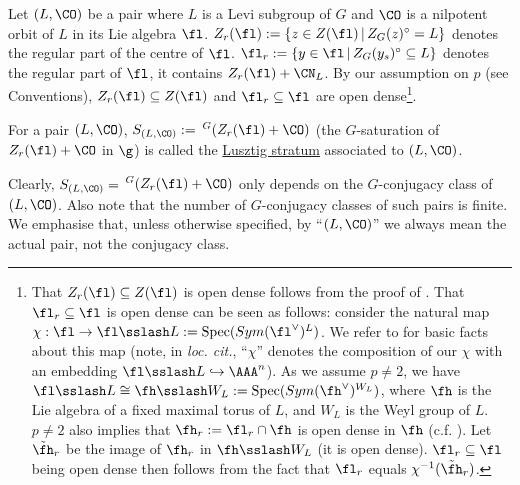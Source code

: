 Let $(L,\CO)$ be a pair where $L$ is a Levi subgroup of $G$ and $\CO$ is a nilpotent orbit of $L$ in its Lie algebra $\fl$. $Z_r(\fl):=\{z\in Z(\fl)\,|\, Z_G(z)^\circ=L\}$ denotes the regular part of the centre of $\fl$. $\fl_r:=\{y\in\fl\,|\, Z_G(y_s)^\circ\subseteq L\}$ denotes the regular part of $\fl$, it contains $Z_r(\fl)+\CN_L$. By our assumption on $p$ (see Conventions), $Z_r(\fl)\subseteq Z(\fl)$ and  $\fl_r\subseteq \fl$ are open dense\footnote{That $Z_r(\fl)\subseteq Z(\fl)$ is open dense follows from the proof of \cite[.13.i]{letellier_fourier_2005}. That $\fl_r\subseteq \fl$ is open dense can be seen as follows: consider the natural map $\chi: \fl\rightarrow \fl\sslash L:= \mathrm{Spec}(Sym(\fl^{\vee})^L)$. We refer to \cite[, 7.13]{jantzen_nilpotent_2004} for basic facts about this map (note, in \textit{loc. cit.}, “$\chi$” denotes the composition of our $\chi$ with an embedding $\fl\sslash L\hookrightarrow \AAA^n$). As we assume $p\neq 2$, we have $\fl\sslash L\cong\fh\sslash W_L:= \mathrm{Spec}(Sym(\fh^{\vee})^{W_L})$, where $\fh$ is the Lie algebra of a fixed maximal torus of $L$, and $W_L$ is the Weyl group of $L$. $p\neq 2$ also implies that $\fh_r:=\fl_r\cap\fh$ is open dense in $\fh$ (c.f. \cite[]{jantzen_nilpotent_2004}). Let $\tilde{\fh}_r$ be the image of $\fh_r$ in $\fh\sslash W_L$ (it is open dense). $\fl_r\subseteq \fl$ being open dense then follows from the fact that $\fl_r$ equals $\chi^{-1}(\tilde{\fh}_r)$.}.

\begin{definition}
    For a pair $(L,\CO)$, $S_{(L,\CO)}:=$ $^G(Z_r(\fl)+\CO)$ (the $G$-saturation of $Z_r(\fl)+\CO$ in $\g$) is called the \underline{Lusztig stratum} associated to $(L,\CO)$.
\end{definition}

Clearly, $S_{(L,\CO)}=$ $^G(Z_r(\fl)+\CO)$ only depends on the $G$-conjugacy class of $(L,\CO)$. Also note that the number of $G$-conjugacy classes of such pairs is finite. We emphasise that, unless otherwise specified, by “$(L,\CO)$” we always mean the actual pair, not the conjugacy class. 

